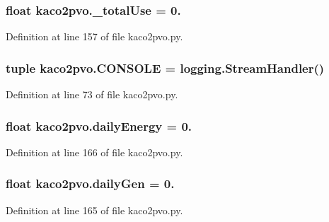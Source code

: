 \subsubsection[{\+\_\+total\+Use}]{\setlength{\rightskip}{0pt plus 5cm}float kaco2pvo.\+\_\+total\+Use = 0.}\label{namespacekaco2pvo_a399c82a403a1875f6361db0c965eb28b}


Definition at line 157 of file kaco2pvo.\+py.

\hypertarget{namespacekaco2pvo_adf356df59afe5b3a345850ed820ef806}{}
\subsubsection[{C\+O\+N\+S\+O\+L\+E}]{\setlength{\rightskip}{0pt plus 5cm}tuple kaco2pvo.\+C\+O\+N\+S\+O\+L\+E = logging.\+Stream\+Handler()}\label{namespacekaco2pvo_adf356df59afe5b3a345850ed820ef806}


Definition at line 73 of file kaco2pvo.\+py.

\hypertarget{namespacekaco2pvo_adc1dd81395978d32a695d89283409598}{}
\subsubsection[{daily\+Energy}]{\setlength{\rightskip}{0pt plus 5cm}float kaco2pvo.\+daily\+Energy = 0.}\label{namespacekaco2pvo_adc1dd81395978d32a695d89283409598}


Definition at line 166 of file kaco2pvo.\+py.

\hypertarget{namespacekaco2pvo_a0869eb37a51cb27c283bbd7399e48751}{}
\subsubsection[{daily\+Gen}]{\setlength{\rightskip}{0pt plus 5cm}float kaco2pvo.\+daily\+Gen = 0.}\label{namespacekaco2pvo_a0869eb37a51cb27c283bbd7399e48751}


Definition at line 165 of file kaco2pvo.\+py.

\hypertarget{namespacekaco2pvo_ad372d037c3416924e35d0d8b40afa572}{}

